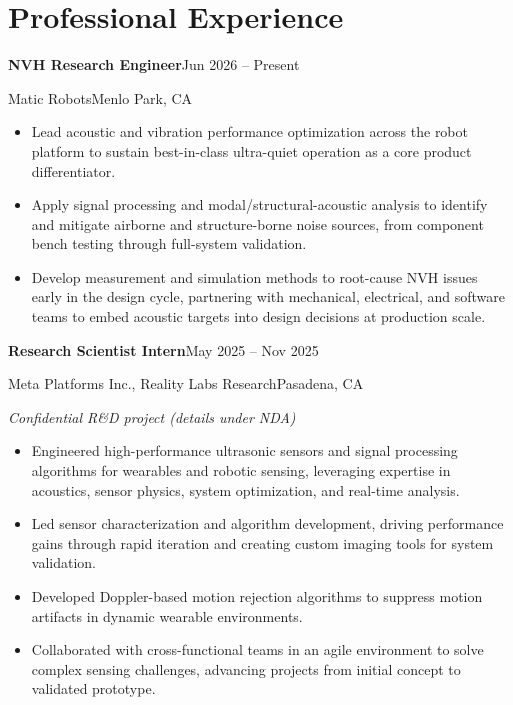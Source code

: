 \documentclass[10pt,letterpaper]{article}
\newcommand{\entry}[4]{%
  {\textbf{\color{navy}#1}\hfill{\color{muted}\small #2}\par}%
  {{\color{accent}#3}\hfill{\color{muted}\small #4}\par}\vspace{2pt}}
\newcommand{\detail}[1]{{\small #1}\par}
\newcommand{\gap}{\vspace{7pt}}
\begin{document}
\section{Professional Experience}

\entry{NVH Research Engineer}{Jun 2026 -- Present}{Matic Robots}{Menlo Park, CA}
\begin{itemize}
  \item Lead acoustic and vibration performance optimization across the robot platform to sustain best-in-class ultra-quiet operation as a core product differentiator.
  \item Apply signal processing and modal/structural-acoustic analysis to identify and mitigate airborne and structure-borne noise sources, from component bench testing through full-system validation.
  \item Develop measurement and simulation methods to root-cause NVH issues early in the design cycle, partnering with mechanical, electrical, and software teams to embed acoustic targets into design decisions at production scale.
\end{itemize}
\gap

\entry{Research Scientist Intern}{May 2025 -- Nov 2025}{Meta Platforms Inc., Reality Labs Research}{Pasadena, CA}
\detail{\itshape\color{muted}Confidential R\&D project (details under NDA)}
\begin{itemize}
  \item Engineered high-performance ultrasonic sensors and signal processing algorithms for wearables and robotic sensing, leveraging expertise in acoustics, sensor physics, system optimization, and real-time analysis.
  \item Led sensor characterization and algorithm development, driving performance gains through rapid iteration and creating custom imaging tools for system validation.
  \item Developed Doppler-based motion rejection algorithms to suppress motion artifacts in dynamic wearable environments.
  \item Collaborated with cross-functional teams in an agile environment to solve complex sensing challenges, advancing projects from initial concept to validated prototype.
\end{itemize}
\gap
\end{document}
